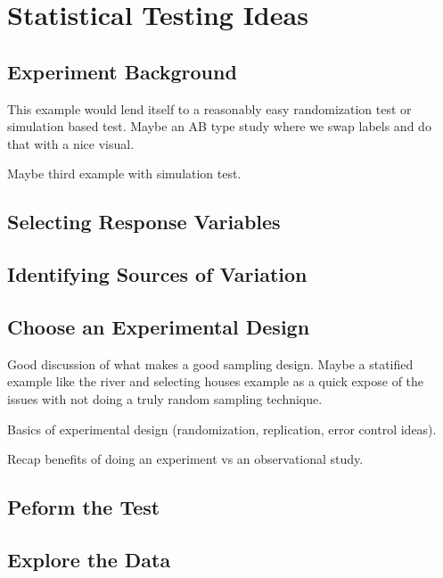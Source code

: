 \documentclass[]{book}
\theoremstyle{definition}
\theoremstyle{definition}
\theoremstyle{definition}
\theoremstyle{remark}
\begin{document}
\section{Statistical Testing Ideas}\label{statistical-testing-ideas}

\subsection{Experiment Background}\label{experiment-background-1}

This example would lend itself to a reasonably easy randomization test
or simulation based test. Maybe an AB type study where we swap labels
and do that with a nice visual.

Maybe third example with simulation test.

\subsection{Selecting Response
Variables}\label{selecting-response-variables-1}

\subsection{Identifying Sources of
Variation}\label{identifying-sources-of-variation-1}

\subsection{Choose an Experimental
Design}\label{choose-an-experimental-design-1}

Good discussion of what makes a good sampling design. Maybe a statified
example like the river and selecting houses example as a quick expose of
the issues with not doing a truly random sampling technique.

Basics of experimental design (randomization, replication, error control
ideas).

Recap benefits of doing an experiment vs an observational study.

\subsection{Peform the Test}\label{peform-the-test-1}

\subsection{Explore the Data}\label{explore-the-data}
\end{document}
